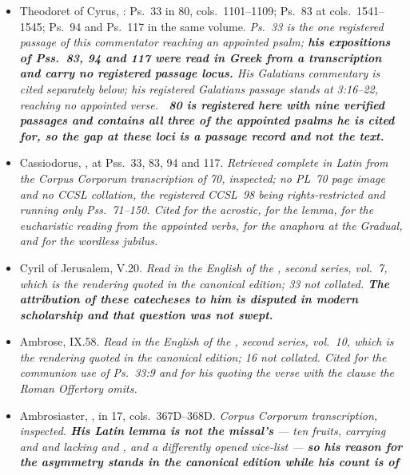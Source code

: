 \begin{itemize}[leftmargin=1.2em, itemsep=0.15em]
{that work.}
\item Theodoret of Cyrus, : Ps.~33 in
 80, cols.~1101--1109; Ps.~83 at cols.~1541--1545;
Ps.~94 and Ps.~117 in the same volume. \textit{Ps.~33 is the one registered
passage of this commentator reaching an appointed psalm; \textbf{his
expositions of Pss.~83, 94 and 117 were read in Greek from a transcription and
carry no registered passage locus.} His Galatians commentary is
cited separately below; his registered Galatians passage stands at 3:16--22,
reaching no appointed verse. \textbf{~80 is registered
here with nine verified passages and contains all three of the appointed psalms
he is cited for, so the gap at these loci is a passage record and not the
text.}}
\item Cassiodorus, , at Pss.~33, 83, 94 and 117.
\textit{Retrieved complete in Latin from the Corpus Corporum transcription of
 70, inspected; no PL~70 page image and no CCSL
collation, the registered CCSL~98 being rights-restricted and running only
Pss.~71--150. Cited for the  acrostic, for the
 lemma, for the eucharistic reading from the
appointed verbs, for the anaphora at the Gradual, and for the wordless
jubilus.}
\item Cyril of Jerusalem,  V.20. \textit{Read in
the English of the , second series,
vol.~7, which is the rendering quoted in the canonical edition;
 33 not collated. \textbf{The attribution of these catecheses to him is disputed in
modern scholarship and that question was not swept.}}
\item Ambrose,  IX.58. \textit{Read in the English of the
, second series, vol.~10, which is the
rendering quoted in the canonical edition;  16 not
collated. Cited for the
communion use of Ps.~33:9 and for his quoting the verse with the clause the
Roman Offertory omits.}
\item Ambrosiaster, , in
 17, cols.~367D--368D. \textit{Corpus Corporum
transcription, inspected. \textbf{His Latin lemma is not the missal's} --- ten
fruits, carrying  and  and lacking 
and , and a differently opened vice-list --- \textbf{so his
reason for the asymmetry stands in the canonical edition while his count is of
}}
\end{itemize}
